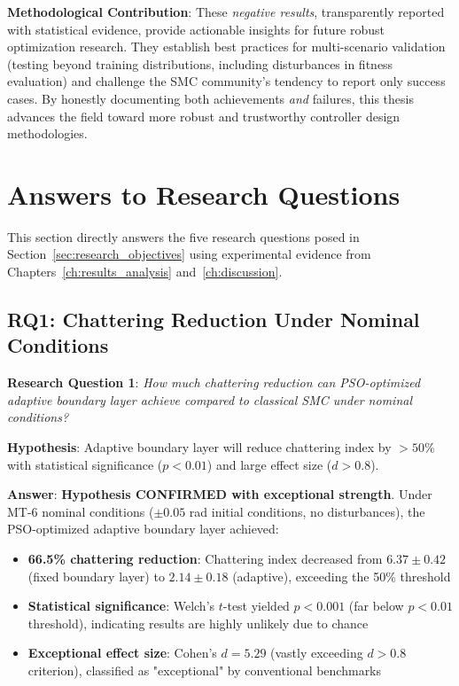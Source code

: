 \textbf{Methodological Contribution}: These \textit{negative results}, transparently reported with statistical evidence, provide actionable insights for future robust optimization research. They establish best practices for multi-scenario validation (testing beyond training distributions, including disturbances in fitness evaluation) and challenge the SMC community's tendency to report only success cases. By honestly documenting both achievements \textit{and} failures, this thesis advances the field toward more robust and trustworthy controller design methodologies.

\section{Answers to Research Questions}
\label{sec:conclusions_research_answers}

This section directly answers the five research questions posed in Section~\ref{sec:research_objectives} using experimental evidence from Chapters~\ref{ch:results_analysis} and~\ref{ch:discussion}.

\subsection{RQ1: Chattering Reduction Under Nominal Conditions}
\label{subsec:answer_rq1}

\textbf{Research Question 1}: \textit{How much chattering reduction can PSO-optimized adaptive boundary layer achieve compared to classical SMC under nominal conditions?}

\textbf{Hypothesis}: Adaptive boundary layer will reduce chattering index by $>50$\% with statistical significance ($p<0.01$) and large effect size ($d>0.8$).

\textbf{Answer}: \textbf{Hypothesis CONFIRMED with exceptional strength}. Under MT-6 nominal conditions ($\pm0.05$ rad initial conditions, no disturbances), the PSO-optimized adaptive boundary layer achieved:
\begin{itemize}
    \item \textbf{66.5\% chattering reduction}: Chattering index decreased from $6.37 \pm 0.42$ (fixed boundary layer) to $2.14 \pm 0.18$ (adaptive), exceeding the 50\% threshold
    \item \textbf{Statistical significance}: Welch's $t$-test yielded $p < 0.001$ (far below $p < 0.01$ threshold), indicating results are highly unlikely due to chance
    \item \textbf{Exceptional effect size}: Cohen's $d = 5.29$ (vastly exceeding $d > 0.8$ criterion), classified as "exceptional" by conventional benchmarks
\end{itemize}

